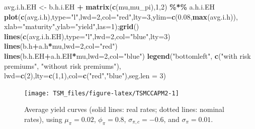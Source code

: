 \documentclass[
  12pt,
]{book}
\newenvironment{Shaded}{\begin{snugshade}}{\end{snugshade}}
\newcommand{\AttributeTok}[1]{\textcolor[rgb]{0.13,0.29,0.53}{#1}}
\newcommand{\DecValTok}[1]{\textcolor[rgb]{0.00,0.00,0.81}{#1}}
\newcommand{\FloatTok}[1]{\textcolor[rgb]{0.00,0.00,0.81}{#1}}
\newcommand{\FunctionTok}[1]{\textcolor[rgb]{0.13,0.29,0.53}{\textbf{#1}}}
\newcommand{\NormalTok}[1]{#1}
\newcommand{\OtherTok}[1]{\textcolor[rgb]{0.56,0.35,0.01}{#1}}
\newcommand{\SpecialCharTok}[1]{\textcolor[rgb]{0.81,0.36,0.00}{\textbf{#1}}}
\newcommand{\StringTok}[1]{\textcolor[rgb]{0.31,0.60,0.02}{#1}}
\theoremstyle{definition}
\theoremstyle{definition}
\theoremstyle{definition}
\theoremstyle{definition}
\theoremstyle{remark}
\begin{document}
\begin{Shaded}
\begin{Highlighting}[]
\NormalTok{avg.i.h.EH }\OtherTok{\textless{}{-}}\NormalTok{ b.h.i.EH }\SpecialCharTok{+} \FunctionTok{matrix}\NormalTok{(}\FunctionTok{c}\NormalTok{(mu,mu\_pi),}\DecValTok{1}\NormalTok{,}\DecValTok{2}\NormalTok{) }\SpecialCharTok{\%*\%}\NormalTok{ a.h.i.EH}
\FunctionTok{plot}\NormalTok{(}\FunctionTok{c}\NormalTok{(avg.i.h),}\AttributeTok{type=}\StringTok{"l"}\NormalTok{,}\AttributeTok{lwd=}\DecValTok{2}\NormalTok{,}\AttributeTok{col=}\StringTok{"red"}\NormalTok{,}\AttributeTok{lty=}\DecValTok{3}\NormalTok{,}\AttributeTok{ylim=}\FunctionTok{c}\NormalTok{(}\FloatTok{0.08}\NormalTok{,}\FunctionTok{max}\NormalTok{(avg.i.h)),}
     \AttributeTok{xlab=}\StringTok{"maturity"}\NormalTok{,}\AttributeTok{ylab=}\StringTok{"yield"}\NormalTok{,}\AttributeTok{las=}\DecValTok{1}\NormalTok{);}\FunctionTok{grid}\NormalTok{()}
\FunctionTok{lines}\NormalTok{(}\FunctionTok{c}\NormalTok{(avg.i.h.EH),}\AttributeTok{type=}\StringTok{"l"}\NormalTok{,}\AttributeTok{lwd=}\DecValTok{2}\NormalTok{,}\AttributeTok{col=}\StringTok{"blue"}\NormalTok{,}\AttributeTok{lty=}\DecValTok{3}\NormalTok{)}
\FunctionTok{lines}\NormalTok{(b.h}\SpecialCharTok{+}\NormalTok{a.h}\SpecialCharTok{*}\NormalTok{mu,}\AttributeTok{lwd=}\DecValTok{2}\NormalTok{,}\AttributeTok{col=}\StringTok{"red"}\NormalTok{)}
\FunctionTok{lines}\NormalTok{(b.h.EH}\SpecialCharTok{+}\NormalTok{a.h.EH}\SpecialCharTok{*}\NormalTok{mu,}\AttributeTok{lwd=}\DecValTok{2}\NormalTok{,}\AttributeTok{col=}\StringTok{"blue"}\NormalTok{)}
\FunctionTok{legend}\NormalTok{(}\StringTok{"bottomleft"}\NormalTok{,}
       \FunctionTok{c}\NormalTok{(}\StringTok{"with risk premiums"}\NormalTok{,}
         \StringTok{"without risk premiums"}\NormalTok{),}
       \AttributeTok{lwd=}\FunctionTok{c}\NormalTok{(}\DecValTok{2}\NormalTok{),}\AttributeTok{lty=}\FunctionTok{c}\NormalTok{(}\DecValTok{1}\NormalTok{,}\DecValTok{1}\NormalTok{),}\AttributeTok{col=}\FunctionTok{c}\NormalTok{(}\StringTok{"red"}\NormalTok{,}\StringTok{"blue"}\NormalTok{),}\AttributeTok{seg.len =} \DecValTok{3}\NormalTok{)}
\end{Highlighting}
\end{Shaded}

\begin{figure}
\texttt{[image: TSM\_files/figure-latex/TSMCCAPM2-1]} \caption{Average yield curves (solid lines: real rates; dotted lines: nominal rates), using $\mu_\pi = 0.02$, $\phi_\pi=0.8$, $\sigma_{\pi,c}=-0.6$, and $\sigma_\pi=0.01$.}\label{fig:TSMCCAPM2}
\end{figure}
\end{document}
